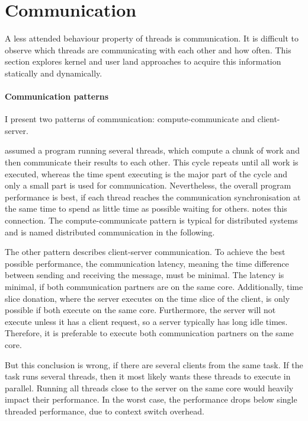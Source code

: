 \section{Communication}
\label{design:comm}

A less attended behaviour property of threads is communication.
It is difficult to observe which threads are communicating with each other and
how often.
This section explores kernel and user land approaches to acquire this
information statically and dynamically.


\paragraph{Communication patterns}
I present two patterns of communication: compute-communicate and client-server.

\citeauthor{hofmeyr_load_2010} assumed a program running several threads, which
compute a chunk of work and then communicate their results to each other.
This cycle repeats until all work is executed, whereas the time spent executing
is the major part of the cycle and only a small part is used for communication.
Nevertheless, the overall program performance is best, if each thread reaches
the communication synchronisation at the same time to spend as little time as
possible waiting for others.
\cite{hofmeyr_load_2010} notes this connection.
The compute-communicate pattern is typical for distributed systems and is named
distributed communication in the following.

The other pattern describes client-server communication.
To achieve the best possible performance, the communication latency, meaning
the time difference between sending and receiving the message, must be minimal.
The latency is minimal, if both communication partners are on the same core.
Additionally, time slice donation, where the server executes on the time slice
of the client, is only possible if both execute on the same core.
Furthermore, the server will not execute unless it has a client request, so a
server typically has long idle times.
Therefore, it is preferable to execute both communication partners on the same
core.

But this conclusion is wrong, if there are several clients from the same task.
If the task runs several threads, then it most likely wants these threads to
execute in parallel.
Running all threads close to the server on the same core would heavily impact
their performance.
In the worst case, the performance drops below single threaded performance, due
to context switch overhead.


